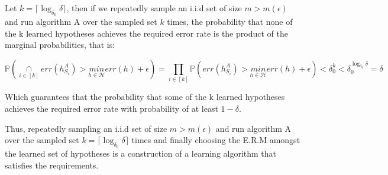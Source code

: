Let $k=\lceil \log_{\delta_0}\delta \rceil$, then if we repeatedly sample an i.i.d set of size $m > m(\epsilon)$ and run algorithm A over the sampled set $k$ times, the probability that none of the k learned hypotheses achieves the required error rate is the product of the marginal probabilities, that is:

\begin{equation*}
    \mathbb{P}\left(\underset{i\in[k]}{\cap} err(h^A_{S_i}) > \underset{h\in\mathcal{H}}{min} err(h) + \epsilon\right) 
     = \prod_{i\in[k]} \mathbb{P}\left(err(h^A_{S_i}) > \underset{h\in\mathcal{H}}{min} err(h) + \epsilon\right)
     < \delta_0^k < \delta_0^{\log_{\delta_0}\delta} = \delta
\end{equation*}

Which guarantees that the probability that some of the k learned hypotheses achieves the required error rate with probability of at least $1-\delta$.

Thus, repeatedly sampling an i.i.d set of size $m > m(\epsilon)$ and run algorithm A over the sampled set $k=\lceil \log_{\delta_0}\delta \rceil$ times and finally choosing the E.R.M amongst the learned set of hypotheses is a construction of a learning algorithm that satisfies the requirements.